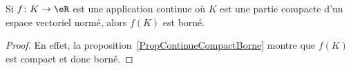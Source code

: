 \begin{corollary}	\label{CorFnContinueCompactBorne}
	Si \( f\colon K\to \eR\) est une application continue où \( K\) est une partie compacte d'un espace vectoriel normé, alors \( f(K)\) est borné.
\end{corollary}

\begin{proof}
	En effet, la proposition~\ref{PropContinueCompactBorne} montre que \( f(K)\) est compact et donc borné.
\end{proof}
